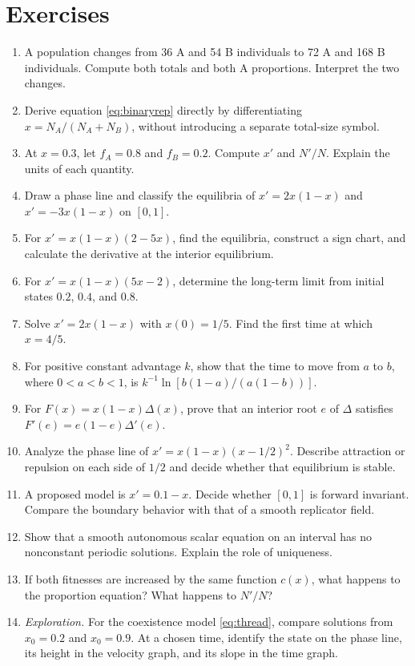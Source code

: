\documentclass[11pt,oneside,openany]{book}
\theoremstyle{definition}
\theoremstyle{remark}
\newenvironment{exercises}{\begin{enumerate}[label=\thechapter.\arabic*,ref=\thechapter.\arabic*,leftmargin=2.8em,itemsep=6pt]}{\end{enumerate}}
\numberwithin{equation}{chapter}
\begin{document}
\section{Exercises}
\begin{exercises}
\item A population changes from 36 A and 54 B individuals to 72 A and 168 B individuals. Compute both totals and both A proportions. Interpret the two changes.
\item Derive equation \eqref{eq:binaryrep} directly by differentiating $x=N_A/(N_A+N_B)$, without introducing a separate total-size symbol.
\item At $x=0.3$, let $f_A=0.8$ and $f_B=0.2$. Compute $x'$ and $N'/N$. Explain the units of each quantity.
\item Draw a phase line and classify the equilibria of $x'=2x(1-x)$ and $x'=-3x(1-x)$ on $[0,1]$.
\item For $x'=x(1-x)(2-5x)$, find the equilibria, construct a sign chart, and calculate the derivative at the interior equilibrium.
\item For $x'=x(1-x)(5x-2)$, determine the long-term limit from initial states $0.2$, $0.4$, and $0.8$.
\item Solve $x'=2x(1-x)$ with $x(0)=1/5$. Find the first time at which $x=4/5$.
\item For positive constant advantage $k$, show that the time to move from $a$ to $b$, where $0<a<b<1$, is $k^{-1}\ln[b(1-a)/(a(1-b))]$.
\item For $F(x)=x(1-x)\Delta(x)$, prove that an interior root $e$ of $\Delta$ satisfies $F'(e)=e(1-e)\Delta'(e)$.
\item Analyze the phase line of $x'=x(1-x)(x-1/2)^2$. Describe attraction or repulsion on each side of $1/2$ and decide whether that equilibrium is stable.
\item A proposed model is $x'=0.1-x$. Decide whether $[0,1]$ is forward invariant. Compare the boundary behavior with that of a smooth replicator field.
\item Show that a smooth autonomous scalar equation on an interval has no nonconstant periodic solutions. Explain the role of uniqueness.
\item If both fitnesses are increased by the same function $c(x)$, what happens to the proportion equation? What happens to $N'/N$?
\item \emph{Exploration.} For the coexistence model \eqref{eq:thread}, compare solutions from $x_0=0.2$ and $x_0=0.9$. At a chosen time, identify the state on the phase line, its height in the velocity graph, and its slope in the time graph.

\end{exercises}
\end{document}
